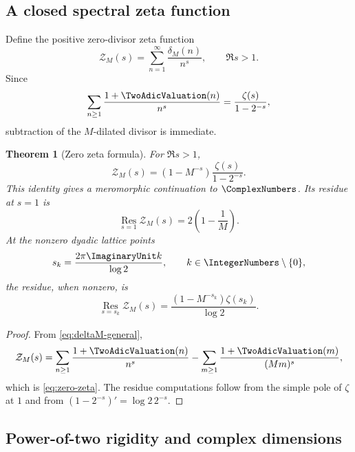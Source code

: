 \documentclass[11pt,oneside]{article}
\newtheorem{theorem}{Theorem}[section]
\theoremstyle{definition}
\theoremstyle{remark}
\begin{document}
\subsection{A closed spectral zeta function}

Define the positive zero-divisor zeta function
\begin{equation}
 \mathcal Z_M(s)=\sum_{n=1}^{\infty}\frac{\delta_M(n)}{n^s},
 \qquad \Re s>1.
 \label{eq:ZM-zeta-def}
\end{equation}
Since
\begin{equation}
 \sum_{n\ge1}\frac{1+\TwoAdicValuation(n)}{n^s}
 =\frac{\zeta(s)}{1-2^{-s}},
 \label{eq:Phi-zero-zeta}
\end{equation}
subtraction of the $M$-dilated divisor is immediate.

\begin{theorem}[Zero zeta formula]
\label{thm:zero-zeta}
For $\Re s>1$,
\begin{equation}
 \boxed{
 \mathcal Z_M(s)=(1-M^{-s})\frac{\zeta(s)}{1-2^{-s}}.}
 \label{eq:zero-zeta}
\end{equation}
This identity gives a meromorphic continuation to $\ComplexNumbers$.  Its residue at $s=1$ is
\begin{equation}
 \operatorname*{Res}_{s=1}\mathcal Z_M(s)=2\left(1-\frac1M\right).
 \label{eq:zeta-res-one}
\end{equation}
At the nonzero dyadic lattice points
\begin{equation}
 s_k=\frac{2\pi\ImaginaryUnit k}{\log2},\qquad k\in\IntegerNumbers\setminus\{0\},
 \label{eq:dyadic-complex-dim}
\end{equation}
the residue, when nonzero, is
\begin{equation}
 \operatorname*{Res}_{s=s_k}\mathcal Z_M(s)
 =\frac{(1-M^{-s_k})\zeta(s_k)}{\log2}.
 \label{eq:zeta-res-sk}
\end{equation}
\end{theorem}

\begin{proof}
From \eqref{eq:deltaM-general},
\[
 \mathcal Z_M(s)
 =\sum_{n\ge1}\frac{1+\TwoAdicValuation(n)}{n^s}
 -\sum_{m\ge1}\frac{1+\TwoAdicValuation(m)}{(Mm)^s},
\]
which is \eqref{eq:zero-zeta}.  The residue computations follow from the simple pole of
$\zeta$ at $1$ and from
$(1-2^{-s})'=\log2\,2^{-s}$.
\end{proof}

\subsection{Power-of-two rigidity and complex dimensions}
\end{document}
